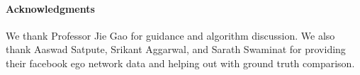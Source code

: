 \paragraph{Acknowledgments}
\label{ack}

%
%
%
%
%

We thank Professor Jie Gao for guidance and algorithm discussion.
We also thank Aaswad Satpute, Srikant Aggarwal, and Sarath Swaminat
for providing their facebook ego network data and helping out with
ground truth comparison.

